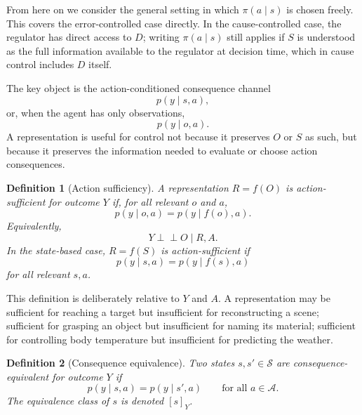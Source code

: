 \documentclass[11pt]{article}
\newtheorem{definition}{Definition}
\theoremstyle{remark}
\newcommand{\Acal}{\mathcal A}
\newcommand{\Scal}{\mathcal S}
\newcommand{\1}{\mathbb 1}
\begin{document}
From here on we consider the general setting in which $\pi(a\mid s)$ is chosen freely. This covers the error-controlled case directly. In the cause-controlled case, the regulator has direct access to $D$; writing $\pi(a\mid s)$ still applies if $S$ is understood as the full information available to the regulator at decision time, which in cause control includes $D$ itself.

The key object is the action-conditioned consequence channel
\begin{equation}
    p(y\mid s,a),
    \label{eq:consequence-channel}
\end{equation}
or, when the agent has only observations,
\begin{equation}
    p(y\mid o,a).
\end{equation}
A representation is useful for control not because it preserves $O$ or $S$ as such, but because it preserves the information needed to evaluate or choose action consequences.

\begin{definition}[Action sufficiency]
\label{def:action-sufficiency}
A representation $R=f(O)$ is \emph{action-sufficient} for outcome $Y$ if, for all relevant $o$ and $a$,
\begin{equation}
    p(y\mid o,a) = p(y\mid f(o),a).
    \label{eq:action-sufficiency-observation}
\end{equation}
Equivalently,
\begin{equation}
    Y \perp\!\!\!\perp O \mid R,A.
\end{equation}
In the state-based case, $R=f(S)$ is action-sufficient if
\begin{equation}
    p(y\mid s,a) = p(y\mid f(s),a)
    \label{eq:action-sufficiency-state}
\end{equation}
for all relevant $s,a$.
\end{definition}

This definition is deliberately relative to $Y$ and $A$. A representation may be sufficient for reaching a target but insufficient for reconstructing a scene; sufficient for grasping an object but insufficient for naming its material; sufficient for controlling body temperature but insufficient for predicting the weather.

\begin{definition}[Consequence equivalence]
\label{def:consequence-equivalence}
Two states $s,s'\in\Scal$ are consequence-equivalent for outcome $Y$ if
\begin{equation}
    p(y\mid s,a)=p(y\mid s',a)
    \qquad \text{for all } a\in\Acal.
    \label{eq:consequence-equivalence}
\end{equation}
The equivalence class of $s$ is denoted $[s]_Y$.
\end{definition}
\end{document}
